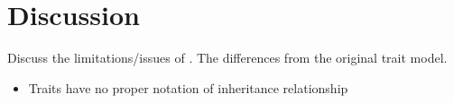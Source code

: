 
\section{Discussion}
\label{sec:discuss}

Discuss the limitations/issues of \name. The differences from the original trait model.



\begin{itemize}
\item Traits have no proper notation of inheritance relationship
\end{itemize}